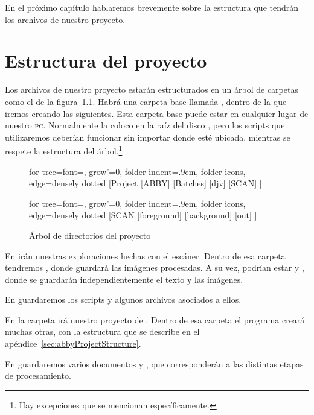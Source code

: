 \documentclass[%
	a5paper,
	10pt,
	twoside,
	openright,
	final,
]{memoir}
\begin{document}
	En el próximo capítulo hablaremos brevemente sobre la estructura que tendrán los archivos de nuestro proyecto.

	\chapter{Estructura del proyecto} Los archivos de nuestro proyecto estarán estructurados en un árbol de carpetas como el de la figura~\ref{fig:projectStructure}. Habrá una carpeta base llamada , dentro de la que iremos creando las siguientes. Esta carpeta base puede estar en cualquier lugar de nuestro \textsc{pc}. Normalmente la coloco en la raíz del disco , pero los scripts que utilizaremos deberían funcionar sin importar donde esté ubicada, mientras se respete la estructura del árbol.\footnote{Hay excepciones que se mencionan específicamente.}

	\begin{figure}
		\hspace*{\fill}
		\begin{forest}
			for tree={font=\sffamily, grow'=0,
				folder indent=.9em, folder icons,
				edge=densely dotted}
			[Project
			[ABBY]
			[Batches]
			[djv]
			[SCAN]
			]
		\end{forest}\hfill
		\begin{forest}
			for tree={font=\sffamily, grow'=0,
				folder indent=.9em, folder icons,
				edge=densely dotted}
			[SCAN
			[foreground]
			[background]
			[out]
			]
		\end{forest}%
		\hspace*{\fill}
		\caption{Árbol de directorios del proyecto\label{fig:projectStructure}}
	\end{figure}

	En  irán nuestras exploraciones hechas con el escáner. Dentro de esa carpeta tendremos , donde \scantailor guardará las imágenes procesadas. A su vez, podrían estar  y , donde se guardarán independientemente el texto y las imágenes.

	En  guardaremos los scripts y algunos archivos asociados a ellos.

	En la carpeta  irá nuestro proyecto de \abby. Dentro de esa carpeta el programa creará muchas otras, con la estructura que se describe en el apéndice~\ref{sec:abbyProjectStructure}.

	En  guardaremos varios documentos \pdf y \djvu, que corresponderán a las distintas etapas de procesamiento.
\end{document}
